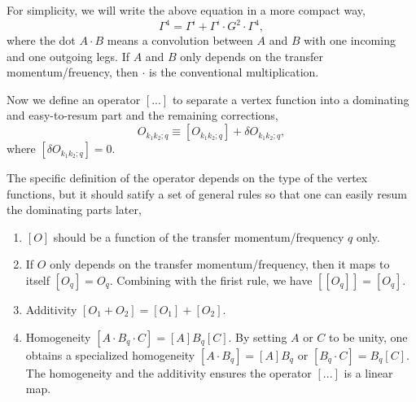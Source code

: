 \documentclass[reprint,amsmath,amssymb,aps,prb]{revtex4-1}
\begin{document}
For simplicity, we will write the above equation in a more compact way,
\begin{equation}
    \Gamma^4=\Gamma^{i}+\Gamma^{i}\cdot G^2 \cdot \Gamma^4,
\end{equation}
where the dot $A\cdot B$ means a convolution between $A$ and $B$ with one incoming and one outgoing legs.
If $A$ and $B$ only depends on the transfer momentum/freuency, then $\cdot$ is the conventional multiplication.

Now we define an operator $[...]$ to separate a vertex function into a dominating and easy-to-resum part
and the remaining corrections,
\begin{equation}
    O_{k_1k_2;q} \equiv [O_{k_1k_2;q}]+\delta O_{k_1k_2;q},
\end{equation}
where $[\delta O_{k_1k_2;q}]=0$.

The specific definition of the operator depends on the type of the vertex functions,
but it should satify a set of general rules so that one can easily resum the dominating parts later,
\begin{enumerate}
    \item $[O]$ should be a function of the transfer momentum/frequency $q$ only.
    \item If $O$ only depends on the transfer momentum/frequency, then it maps to itself $[O_q]=O_q$.
          Combining with the firist rule, we have $[[O_q]]=[O_q]$.
    \item Additivity $[O_1+O_2]=[O_1]+[O_2]$.
    \item Homogeneity $[A\cdot B_q \cdot C] = [A]B_q[C]$. By setting $A$ or $C$ to be unity, one obtains a specialized
          homogeneity $[A\cdot B_q] = [A]B_q$ or $[B_q\cdot C] = B_q[C]$. The homogeneity
          and the additivity ensures the operator $[...]$ is a linear map.
\end{enumerate}
\end{document}
